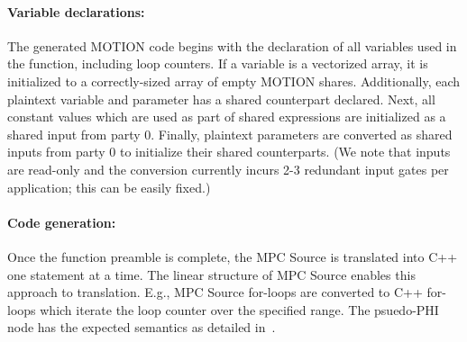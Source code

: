 

\paragraph{Variable declarations:}

The generated MOTION code begins with the declaration of all variables used in the function, including loop counters.  If a variable is a vectorized array, it is initialized to a correctly-sized array of empty MOTION shares.  Additionally, each plaintext variable and parameter has a shared counterpart declared.  Next, all constant values which are used as part of shared expressions are initialized as a shared input from party 0. Finally, plaintext parameters are converted as shared inputs from party 0 to initialize their shared counterparts. (We note that inputs are read-only and
the conversion currently incurs 2-3 redundant input gates per application; this can be easily fixed.)

\paragraph{Code generation:}
Once the function preamble is complete, the MPC Source is translated into C++ one statement at a time. The linear structure of MPC Source enables this approach to translation. 
E.g., MPC Source for-loops are converted to C++ for-loops which iterate the loop counter over the specified range. The psuedo-PHI node has the expected semantics as detailed in~\cite{Anon_TR}.

